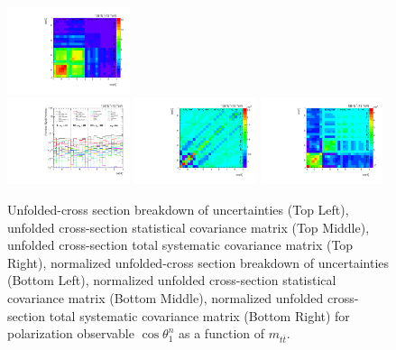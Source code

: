 \begin{refsection}
\begin{figure}[htb]
\begin{center}
 \includegraphics[width=0.32\textwidth]{fig_fullRun2UL/unfolding/combined/TotalSystCovMatrix_rebinnedB_b1n_mttbar.pdf} \\
 \includegraphics[width=0.32\textwidth]{fig_fullRun2UL/unfolding/combined/deltaSystCombinedlogNorm_rebinnedB_b1n_mttbar.pdf}
 \includegraphics[width=0.32\textwidth]{fig_fullRun2UL/unfolding/combined/StatCovMatrixNorm_rebinnedB_b1n_mttbar.pdf}
 \includegraphics[width=0.32\textwidth]{fig_fullRun2UL/unfolding/combined/TotalSystCovMatrixNorm_rebinnedB_b1n_mttbar.pdf} \\
\caption{Unfolded-cross section breakdown of uncertainties (Top Left), unfolded cross-section statistical covariance matrix (Top Middle), unfolded cross-section total systematic covariance matrix (Top Right), normalized unfolded-cross section breakdown of uncertainties (Bottom Left), normalized unfolded cross-section statistical covariance matrix (Bottom Middle), normalized unfolded cross-section total systematic covariance matrix (Bottom Right) for polarization observable $\cos\theta_{1}^{n}$ as a function of $m_{t\bar{t}}$.}
\label{fig:b1n_mttbar_uncertainties}
\end{center}
\end{figure}
\clearpage

\end{refsection}
